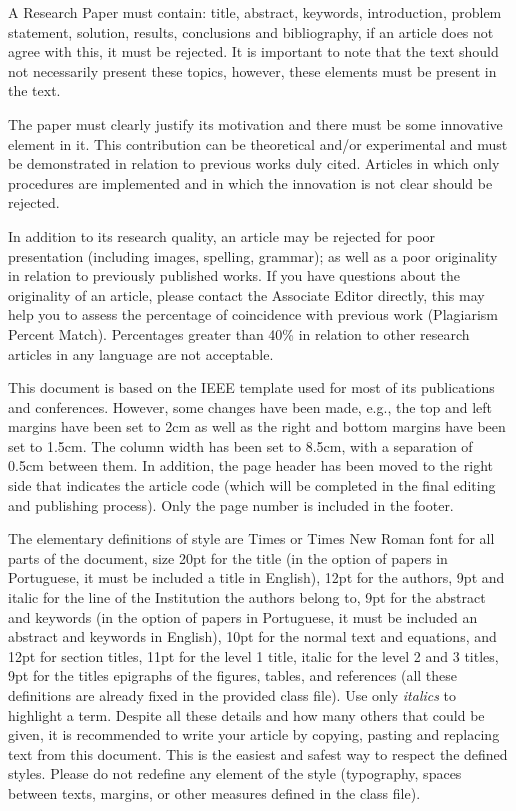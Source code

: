 \documentclass[eng,blind]{ajceam-class}
\begin{document}
A Research Paper must contain: title, abstract, keywords, introduction, problem statement, solution, results, conclusions and bibliography, if an article does not agree with this, it must be rejected. It is important to note that the text should not necessarily present these topics, however, these elements must be present in the text.

The paper must clearly justify its motivation and there must be some innovative element in it. This contribution can be theoretical and/or experimental and must be demonstrated in relation to previous works duly cited. Articles in which only procedures are implemented and in which the innovation is not clear should be rejected.

In addition to its research quality, an article may be rejected for poor presentation (including images, spelling, grammar); as well as a poor originality in relation to previously published works. If you have questions about the originality of an article, please contact the Associate Editor directly, this may help you to assess the percentage of coincidence with previous work (Plagiarism Percent Match). Percentages greater than 40\% in relation to other research articles in any language are not acceptable.

This document is based on the IEEE template used for most of its publications and conferences. However, some changes have been made, e.g., the top and left margins have been set to 2cm as well as the right and bottom margins have been set to 1.5cm. The column width has been set to 8.5cm, with a separation of 0.5cm between them. In addition, the page header has been moved to the right side that indicates the article code (which will be completed in the final editing and publishing process). Only the page number is included in the footer.

The elementary definitions of style are Times or Times New Roman font for all parts of the document, size 20pt for the title (in the option of papers in Portuguese, it must be included a title in English), 12pt for the authors, 9pt and italic for the line of the Institution the authors belong to, 9pt for the abstract and keywords (in the option of papers in Portuguese, it must be included an abstract and keywords in English), 10pt for the normal text and equations, and 12pt for section titles, 11pt for the level 1 title, italic for the level 2 and 3 titles, 9pt for the titles epigraphs of the figures, tables, and references (all these definitions are already fixed in the provided class file). Use only \emph{italics} to highlight a term. Despite all these details and how many others that could be given, it is recommended to write your article by copying, pasting and replacing text from this document. This is the easiest and safest way to respect the defined styles. Please do not redefine any element of the style (typography, spaces between texts, margins, or other measures defined in the class file).
\end{document}
